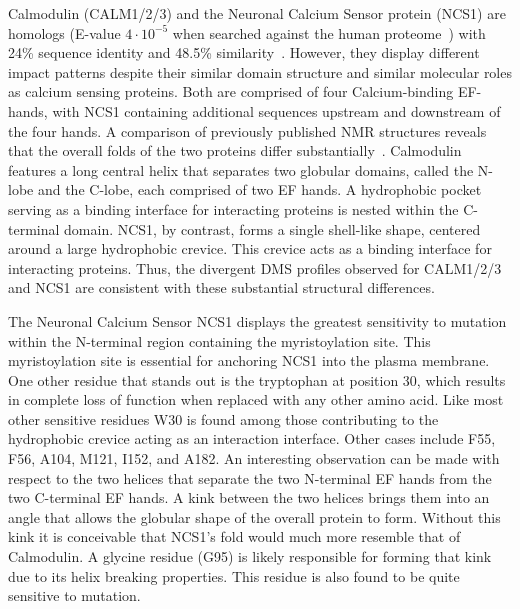 Calmodulin (CALM1/2/3) and the Neuronal Calcium Sensor protein (NCS1) are homologs (E-value $4 \cdot 10^{-5}$ when searched against the human proteome~\cite{altschul_basic_1990,the_uniprot_consortium_uniprot:_2015}) with 24\% sequence identity and 48.5\% similarity~\cite{rice_emboss:_2000}. However, they display different impact patterns despite their similar domain structure and similar molecular roles as calcium sensing proteins. Both are comprised of four Calcium-binding EF-hands, with NCS1 containing additional sequences upstream and downstream of the four hands. A comparison of previously published NMR structures reveals that the overall folds of the two proteins differ substantially~\cite{sarhan_crystallographic_2012,heidarsson_c-terminal_2012}. Calmodulin features a long central helix that separates two globular domains, called the N-lobe and the C-lobe, each comprised of two EF hands. A hydrophobic pocket serving as a binding interface for interacting proteins is nested within the C-terminal domain. NCS1, by contrast, forms a single shell-like shape, centered around a large hydrophobic crevice. This crevice acts as a binding interface for interacting proteins. Thus, the divergent DMS profiles observed for CALM1/2/3 and NCS1 are consistent with these substantial structural differences.

The Neuronal Calcium Sensor NCS1 displays the greatest sensitivity to mutation within the N-terminal region containing the myristoylation site.  This myristoylation site is essential for anchoring NCS1 into the plasma membrane. One other residue that stands out is the tryptophan at position 30, which results in complete loss of function when replaced with any other amino acid. Like most other sensitive residues W30 is found among those contributing to the hydrophobic crevice acting as an interaction interface. Other cases include F55, F56, A104, M121, I152, and A182. An interesting observation can be made with respect to the two helices that separate the two N-terminal EF hands from the two C-terminal EF hands. A kink between the two helices brings them into an angle that allows the globular shape of the overall protein to form. Without this kink it is conceivable that NCS1's fold would much more resemble that of Calmodulin. A glycine residue (G95) is likely responsible for forming that kink due to its helix breaking properties. This residue is also found to be quite sensitive to mutation.

